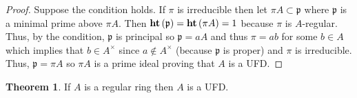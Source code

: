 \documentclass[12pt]{article}
\newcommand{\p}{\mathfrak{p}}
\theoremstyle{remark}
\theoremstyle{definition}
\newtheorem{theorem}{Theorem}[section]
\begin{document}
\begin{proof}
Suppose the condition holds. If $\pi$ is irreducible then let $\pi A \subset \p$ where $\p$ is a minimal prime above $\pi A$. Then $\height{\p} = \height{\pi A} = 1$ because $\pi$ is $A$-regular. Thus, by the condition, $\p$ is principal so $\p = a A$ and thus $\pi = ab$ for some $b \in A$ which implies that $b \in A^\times$ since $a \notin A^\times$ (because $\p$ is proper) and $\pi$ is irreducible. Thus, $\p = \pi A$ so $\pi A$ is a prime ideal proving that $A$ is a UFD. 
\end{proof}

\begin{theorem}
If $A$ is a regular ring then $A$ is a UFD. 
\end{theorem}
\end{document}
